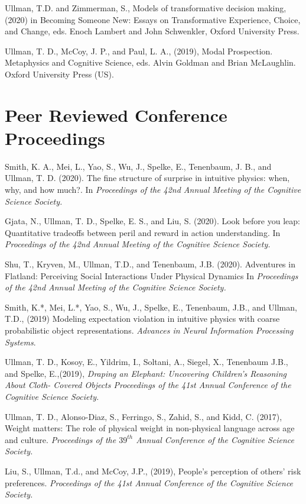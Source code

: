 \documentclass[margin,line,pifont,palatino,courier]{res}
\begin{document}
\begin{resume}
Ullman, T.D. and Zimmerman, S., Models of transformative decision making, (2020) in Becoming Someone New: Essays on Transformative Experience, Choice, and Change, eds. Enoch Lambert and John Schwenkler, Oxford University Press.


Ullman, T. D., McCoy, J. P., and Paul, L. A., (2019), Modal Prospection. Metaphysics and Cognitive Science, eds. Alvin Goldman and Brian McLaughlin. Oxford University Press (US).


\section{\sc Peer Reviewed Conference Proceedings}

Smith, K. A., Mei, L., Yao, S., Wu, J., Spelke, E., Tenenbaum, J. B., and Ullman, T. D. (2020). The fine structure of surprise in intuitive physics: when, why, and how much?. In \textit{Proceedings of the 42nd Annual Meeting of the Cognitive Science Society.}

Gjata, N., Ullman, T. D., Spelke, E. S., and Liu, S. (2020). Look before you leap: Quantitative tradeoffs between peril and reward in action understanding. In \textit{Proceedings of the 42nd Annual Meeting of the Cognitive Science Society.}

Shu, T., Kryven, M., Ullman, T.D., and Tenenbaum, J.B. (2020). Adventures in Flatland: Perceiving Social Interactions Under Physical Dynamics In \textit{Proceedings of the 42nd Annual Meeting of the Cognitive Science Society.}

Smith, K.*, Mei, L.*, Yao, S., Wu, J., Spelke, E., Tenenbaum, J.B., and Ullman, T.D., (2019) Modeling expectation violation in intuitive physics with coarse probabilistic object representations. \textit{Advances in Neural Information Processing Systems}.

Ullman, T. D., Kosoy, E., Yildrim, I., Soltani, A., Siegel, X., Tenenbaum J.B., and Spelke, E.,(2019), \textit{Draping an Elephant: Uncovering Children's Reasoning About Cloth- Covered Objects Proceedings of the 41st Annual Conference of the Cognitive Science Society.}

Ullman, T. D., Alonso-Diaz, S., Ferringo, S., Zahid, S., and Kidd, C. (2017), Weight matters: The role of physical weight in non-physical language across age and culture. \textit{Proceedings of the $39^{th}$ Annual Conference of the Cognitive Science Society.}

Liu, S., Ullman, T.d., and McCoy, J.P., (2019), People's perception of others' risk preferences. \textit{Proceedings of the 41st Annual Conference of the Cognitive Science Society.}


\end{resume}
\end{document}
